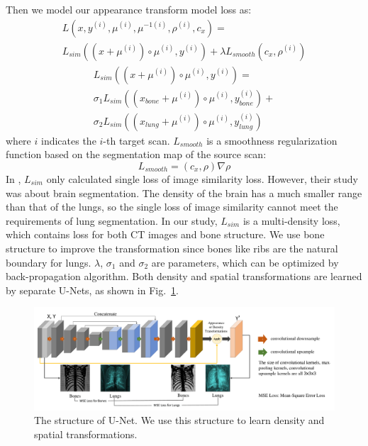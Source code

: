 \documentclass{article}
\def\L{{\cal L}}
\begin{document}
Then we model our appearance transform model loss as:
\begin{align*}
    L(x,y^{(i)},\mu^{(i)},\mu^{-1(i)},\rho^{(i)},c_x)=\qquad\qquad\\L_{sim}((x+\mu^{(i)})\circ\mu^{(i)}, y^{(i)})+\lambda L_{smooth}(c_x,\rho^{(i)})
\end{align*}
\begin{align*}
    L_{sim}((x+\mu^{(i)})\circ\mu^{(i)}, y^{(i)})=\quad\\\sigma_1L_{sim}((x_{bone}+\mu^{(i)})\circ\mu^{(i)}, y_{bone}^{(i)})+\\\sigma_2L_{sim}((x_{lung}+\mu^{(i)})\circ\mu^{(i)}, y_{lung}^{(i)})
\end{align*}
where $i$ indicates the $i$-th target scan. $L_{smooth}$ is a smoothness regularization function based on the segmentation map of the source scan:
\begin{equation}
    L_{smooth}=(c_x,\rho)\nabla\rho
\end{equation}
In \cite{zhao2019data}, $L_{sim}$ only calculated single loss of image similarity loss. However, their study was about brain segmentation. The density of the brain has a much smaller range than that of the lungs, so the single loss of image similarity cannot meet the requirements of lung segmentation. In our study, $L_{sim}$ is a multi-density loss, which contains loss for both CT images and bone structure. We use bone structure to improve the transformation since bones like ribs are the natural boundary for lungs. $\lambda$, $\sigma_1$ and $\sigma_2$ are parameters, which can be optimized by back-propagation algorithm.
Both density and spatial transformations are learned by separate U-Nets, as shown in Fig.~\ref{unet}.
\begin{figure}[t]
    \centerline{\includegraphics[width=180mm]{unet.pdf}}
    \vspace{-0cm}
    \caption{The structure of U-Net. We use this structure to learn density and spatial transformations.
    }
    \vspace{-0cm}
    \label{unet}
    \end{figure}
\end{document}
